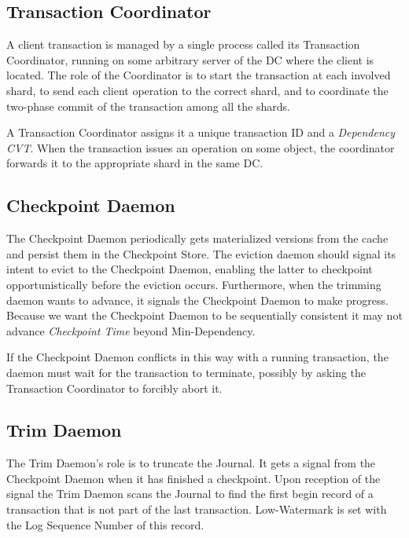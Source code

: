\documentclass[twoside]{article}
\begin{document}
\subsection{Transaction Coordinator}
\label{sec:transaction-coordinator}
            
A client transaction is managed by a single process called its
Transaction Coordinator, running on some arbitrary server of the DC
where the client is located.
The role of the Coordinator is to start the transaction at each involved
shard, to send each client operation to the correct shard, and to
coordinate the two-phase commit of the transaction among all the shards.

A Transaction Coordinator assigns it a unique transaction ID and
a \emph{Dependency CVT}.
When the transaction issues an operation on some object, the coordinator
forwards it to the appropriate shard in the same DC.

\subsection{Checkpoint Daemon}
\label{sec:checkpoint-daemon}

The Checkpoint Daemon periodically gets materialized versions from the cache and 
persist them in the Checkpoint Store.
The eviction daemon should signal its intent to evict to the
Checkpoint Daemon, enabling the latter to checkpoint 
opportunistically before the eviction occurs.
Furthermore, when the trimming daemon wants to advance, it signals the
Checkpoint Daemon to make progress.
Because we want the Checkpoint Daemon to be sequentially consistent
it may not advance \emph{Checkpoint Time} beyond Min-Dependency.

If the Checkpoint Daemon conflicts in this way with a running
transaction, the daemon must wait for the transaction to terminate,
possibly by asking the Transaction Coordinator to forcibly abort it.


\subsection{Trim Daemon}
\label{sec:trim-daemon}

The Trim Daemon's role is to truncate the Journal. 
It gets a signal from the Checkpoint Daemon when it has finished a checkpoint.
Upon reception of the signal the Trim Daemon scans the Journal to find 
the first begin record of a transaction that is not part of the last transaction.
Low-Watermark is set with the Log Sequence Number of this record.
\end{document}
